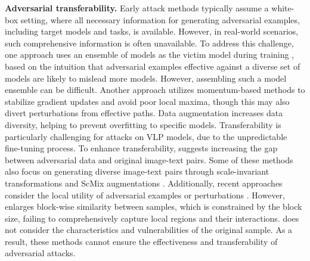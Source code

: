 \noindent\textbf{Adversarial transferability.} Early attack methods typically assume a white-box setting, where all necessary information for generating adversarial examples, including target models and tasks, is available. However, in real-world scenarios, such comprehensive information is often unavailable. To address this challenge, one approach uses an ensemble of models as the victim model during training \cite{liu2016delving, dong2018boosting, dong2019evading, xiong2022stochastic}, based on the intuition that adversarial examples effective against a diverse set of models are likely to mislead more models. However, assembling such a model ensemble can be difficult. Another approach utilizes momentum-based methods \cite{dong2018boosting, long2024convergence, lin2019nesterov, inkawhich2019transferable} to stabilize gradient updates and avoid poor local maxima, though this may also divert perturbations from effective paths. Data augmentation \cite{xie2019improving, fang2022learning, wei2023enhancing, wang2024boosting, wang2021admix} increases data diversity, helping to prevent overfitting to specific models. Transferability is particularly challenging for attacks on VLP models, due to the unpredictable fine-tuning process. To enhance transferability, \cite{zhang2022towards,lu2023set,zhang2024universal} suggests increasing the gap between adversarial data and original image-text pairs. Some of these methods also focus on generating diverse image-text pairs through scale-invariant transformations \cite{lu2023set} and ScMix augmentations \cite{zhang2024universal}. Additionally, recent approaches consider the local utility of adversarial examples \cite{yin2023vlattack} or perturbations \cite{zhang2024universal}. However, \cite{yin2023vlattack} enlarges block-wise similarity between samples, which is constrained by the block size, failing to comprehensively capture local regions and their interactions. \cite{zhang2024universal} does not consider the characteristics and vulnerabilities of the original sample. As a result, these methods cannot ensure the effectiveness and transferability of adversarial attacks.